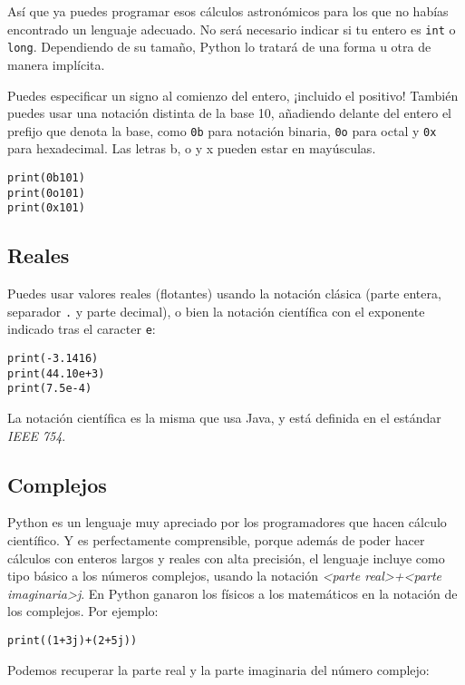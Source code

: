 Así que ya puedes programar esos cálculos astronómicos para los que no habías encontrado un lenguaje adecuado. No será necesario indicar si tu entero es \texttt{int} o \texttt{long}. Dependiendo de su tamaño, Python lo tratará de una forma u otra de manera implícita.

Puedes especificar un signo al comienzo del entero, ¡incluido el positivo! También puedes usar una notación distinta de la base 10, añadiendo delante del entero el prefijo que denota la base, como \texttt{0b} para notación binaria, \texttt{0o} para octal y \texttt{0x} para hexadecimal. Las letras b, o y x pueden estar en mayúsculas.

\begin{lstlisting}
print(0b101)
print(0o101)
print(0x101)
\end{lstlisting}

\subsection{Reales}

Puedes usar valores reales (flotantes) usando la notación clásica (parte entera, separador \texttt{.} y parte decimal), o bien la notación científica con el exponente indicado tras el caracter \texttt{e}:

\begin{lstlisting}
print(-3.1416)
print(44.10e+3)
print(7.5e-4)
\end{lstlisting}

La notación científica es la misma que usa Java, y está definida en el estándar \emph{IEEE 754}.

\subsection{Complejos}

Python es un lenguaje muy apreciado por los programadores que hacen cálculo científico. Y es perfectamente comprensible, porque además de poder hacer cálculos con enteros largos y reales con alta precisión, el lenguaje incluye como tipo básico a los números complejos, usando la notación \emph{<parte real>+<parte imaginaria>j}. En Python ganaron los físicos a los matemáticos en la notación de los complejos. Por ejemplo:

\begin{lstlisting}
print((1+3j)+(2+5j))
\end{lstlisting}

Podemos recuperar la parte real y la parte imaginaria del número complejo:

